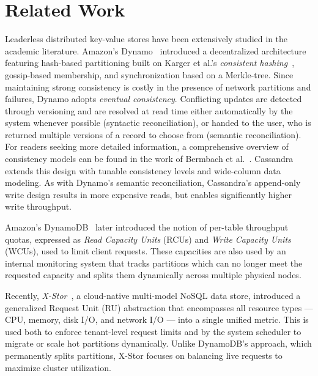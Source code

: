 \section{Related Work}
\label{sec:related}

Leaderless distributed key-value stores have been extensively studied in the academic literature.
Amazon's Dynamo~\cite{Dynamo2007} introduced a decentralized architecture featuring hash-based partitioning
built on Karger et al.'s \textit{consistent hashing}~\cite{ConsistentHashing}, gossip-based membership, and synchronization based on a Merkle-tree.
Since maintaining strong consistency is costly in the presence of network partitions and failures, Dynamo adopts \emph{eventual consistency}.
Conflicting updates are detected through versioning and are resolved
at read time either automatically by the system whenever possible (syntactic reconciliation),
or handed to the user, who is returned multiple versions of a record to choose from (semantic reconciliation).
For readers seeking more detailed information, a comprehensive overview of consistency models
can be found in the work of Bermbach et al.~\cite{ConsistencyOverview}.
Cassandra~\cite{Cassandra} extends this design with tunable consistency levels and wide-column data modeling.
As with Dynamo's semantic reconciliation, Cassandra's append-only write design results in more expensive reads,
but enables significantly higher write throughput.

Amazon's DynamoDB~\cite{Dynamo2022, DynamoWhitepaper} later introduced the notion of per-table throughput quotas,
expressed as \textit{Read Capacity Units} (RCUs) and \textit{Write Capacity Units} (WCUs), used to limit client requests.
These capacities are also used by an internal monitoring system that tracks partitions which can no longer meet the requested capacity
and splits them dynamically across multiple physical nodes.

Recently, \textit{X-Stor}~\cite{XStor}, a cloud-native multi-model NoSQL data store, introduced a generalized Request Unit (RU) abstraction
that encompasses all resource types --- CPU, memory, disk I/O, and network I/O --- into a single unified metric.
This is used both to enforce tenant-level request limits and by the system scheduler to migrate or scale hot partitions dynamically.
Unlike DynamoDB's approach, which permanently splits partitions, X-Stor focuses on balancing live requests to maximize cluster utilization.

